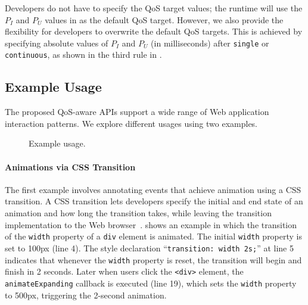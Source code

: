 Developers do not have to specify the QoS target values; the \greenweb runtime will use the $P_I$ and $P_U$ values in  as the default QoS target. However, we also provide the flexibility for developers to overwrite the default QoS targets. This is achieved by specifying absolute values of $P_I$ and $P_U$ (in milliseconds) after \texttt{single} or \texttt{continuous}, as shown in the third rule in .

\subsection{Example Usage}
\label{sec:lang:spec:ex}

The proposed QoS-aware \greenweb APIs support a wide range of Web application interaction patterns. We explore different usages using two examples.

\begin{figure}[t]
\centering
{}
\hspace*{15pt}
\caption{Example \greenweb usage.}
\label{fig:ex}
\end{figure}

\paragraph{Animations via CSS Transition} The first example involves annotating events that achieve animation using a CSS transition. A CSS transition lets developers specify the initial and end state of an animation and how long the transition takes, while leaving the transition implementation to the Web browser~\cite{csstransitions}.  shows an example in which the transition of the \texttt{width} property of a \texttt{div} element is animated. The initial \texttt{width} property is set to 100px (line 4). The style declaration ``\texttt{transition: width 2s;}'' at line 5 indicates that whenever the \texttt{width} property is reset, the transition will begin and finish in 2 seconds. Later when users click the \texttt{<div>} element, the \texttt{animateExpanding} callback is executed (line 19), which sets the \texttt{width} property to 500px, triggering the 2-second animation.

